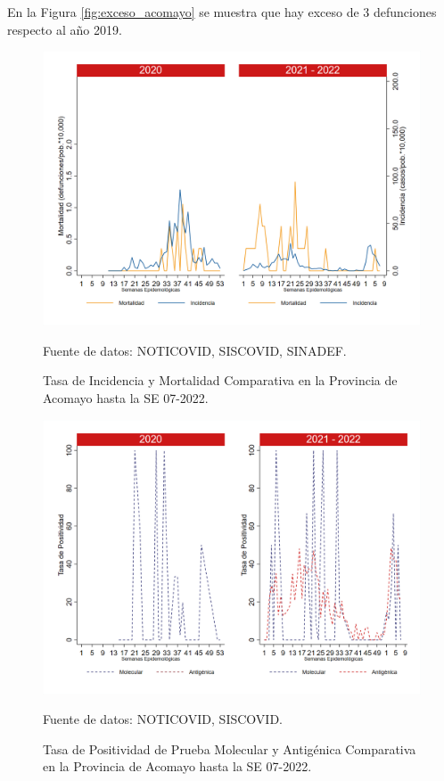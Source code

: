 \documentclass[12pt,a4paper,openany]{book}
\begin{document}
		 En la Figura \ref{fig:exceso_acomayo} se muestra que hay exceso de 3 defunciones respecto al año 2019.
		
		\begin{figure}[h]
			\caption{Tasa de Incidencia y Mortalidad Comparativa en la Provincia de Acomayo hasta la SE 07-2022.}\label{fig:inc_mort_acomayo}
			\begin{center}
				\includegraphics[width=0.70\linewidth]{../figuras/incidencia_mortalidad_20_21_1.png}
			\end{center}
			{\footnotesize {Fuente de datos: NOTICOVID, SISCOVID, SINADEF.}}
		\end{figure}
		
		\begin{figure}[h]
			\caption{Tasa de Positividad de Prueba Molecular y Antigénica Comparativa en la Provincia de Acomayo hasta la SE 07-2022. }\label{fig:positividad_acomayo}
			\begin{center}
				\includegraphics[width=0.7\linewidth]{../figuras/positividad_20_21_1.png}
			\end{center}
			{\footnotesize {Fuente de datos: NOTICOVID, SISCOVID.}}
		\end{figure}
		
\end{document}

